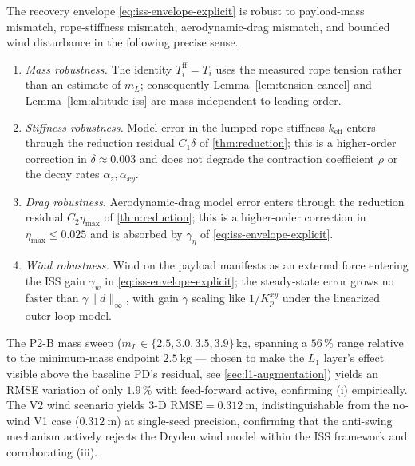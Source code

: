\begin{corollary}
\label{cor:robustness}
The recovery envelope \eqref{eq:iss-envelope-explicit} is robust to payload-mass mismatch, rope-stiffness mismatch, aerodynamic-drag mismatch, and bounded wind disturbance in the following precise sense.
\begin{enumerate}[leftmargin=1.4em,label=(\roman*)]
  \item \emph{Mass robustness.} The identity $T_i^{\mathrm{ff}} = T_i$ uses the measured rope tension rather than an estimate of $m_L$; consequently Lemma~\ref{lem:tension-cancel} and Lemma~\ref{lem:altitude-iss} are mass-independent to leading order.

  \item \emph{Stiffness robustness.} Model error in the lumped rope stiffness $k_{\mathrm{eff}}$ enters through the reduction residual $C_1\delta$ of \cref{thm:reduction}; this is a higher-order correction in $\delta \approx 0.003$ and does not degrade the contraction coefficient $\rho$ or the decay rates $\alpha_z, \alpha_{xy}$.

  \item \emph{Drag robustness.} Aerodynamic-drag model error enters through the reduction residual $C_2\eta_{\max}$ of \cref{thm:reduction}; this is a higher-order correction in $\eta_{\max} \le 0.025$ and is absorbed by $\gamma_\eta$ of \eqref{eq:iss-envelope-explicit}.

  \item \emph{Wind robustness.} Wind on the payload manifests as an external force entering the ISS gain $\gamma_w$ in \eqref{eq:iss-envelope-explicit}; the steady-state error grows no faster than $\gamma \|d\|_\infty$, with gain $\gamma$ scaling like $1/K_p^{xy}$ under the linearized outer-loop model.
\end{enumerate}
\end{corollary}

The P2-B mass sweep ($m_L \in \{2.5, 3.0, 3.5, 3.9\}\,\mathrm{kg}$, spanning a $56\,\%$ range relative to the minimum-mass endpoint $\SI{2.5}{\kilo\gram}$ --- chosen to make the $L_1$ layer's effect visible above the baseline PD's residual, see \cref{sec:l1-augmentation}) yields an RMSE variation of only $1.9\,\%$ with feed-forward active, confirming (i) empirically. The V2 wind scenario yields 3-D $\mathrm{RMSE} = \SI{0.312}{\metre}$, indistinguishable from the no-wind V1 case ($\SI{0.312}{\metre}$) at single-seed precision, confirming that the anti-swing mechanism actively rejects the Dryden wind model within the ISS framework and corroborating (iii).


